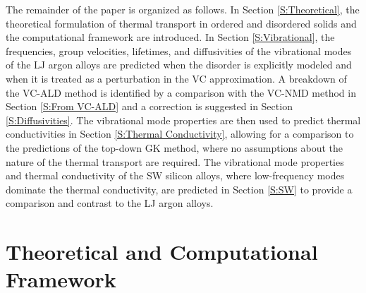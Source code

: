\documentclass[aps,prb,onecolumn,preprint,footinbib,superscriptaddress,amsmath,amssymb,floatfix]{revtex4}
\begin{document}
The remainder of the paper is organized as follows. 
In Section \ref{S:Theoretical}, the theoretical 
formulation of thermal transport in ordered and disordered solids 
and the computational framework are introduced. 
In Section \ref{S:Vibrational}, the frequencies, 
group velocities, lifetimes, and diffusivities of the 
vibrational modes of the LJ argon alloys are 
predicted when the disorder is explicitly modeled and when it is 
treated as a perturbation in the VC approximation. 
A breakdown of the VC-ALD method is identified by a comparison 
with the VC-NMD method in 
Section \ref{S:From VC-ALD}   
and a correction is suggested in Section \ref{S:Diffusivities}. 
The vibrational 
mode properties are then used to predict thermal conductivities 
in Section \ref{S:Thermal Conductivity}, 
allowing for a comparison to the predictions of the top-down  
GK method, where no assumptions about the nature of the 
thermal transport are required. The vibrational mode properties and 
thermal conductivity of the SW silicon alloys, where low-frequency modes 
dominate the thermal conductivity, are predicted in 
Section \ref{S:SW} to provide a comparison and contrast to the 
LJ argon alloys. 




\section{\label{S:Theoretical}Theoretical and Computational Framework}
\end{document}
